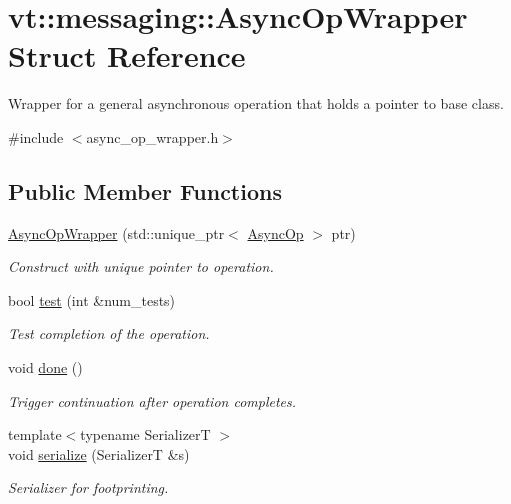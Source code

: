 \hypertarget{structvt_1_1messaging_1_1_async_op_wrapper}{}\section{vt\+:\+:messaging\+:\+:Async\+Op\+Wrapper Struct Reference}
\label{structvt_1_1messaging_1_1_async_op_wrapper}


Wrapper for a general asynchronous operation that holds a pointer to base class.  




{\ttfamily \#include $<$async\+\_\+op\+\_\+wrapper.\+h$>$}

\subsection*{Public Member Functions}
\begin{DoxyCompactItemize}
\item 
\hyperlink{structvt_1_1messaging_1_1_async_op_wrapper_a06c7dd199e7b2c252e23c8d81950feed}{Async\+Op\+Wrapper} (std\+::unique\+\_\+ptr$<$ \hyperlink{structvt_1_1messaging_1_1_async_op}{Async\+Op} $>$ ptr)
\begin{DoxyCompactList}\small\item\em Construct with unique pointer to operation. \end{DoxyCompactList}\item 
bool \hyperlink{structvt_1_1messaging_1_1_async_op_wrapper_a09ca2119c78c9b3663ad6a3708d3a3c7}{test} (int \&num\+\_\+tests)
\begin{DoxyCompactList}\small\item\em Test completion of the operation. \end{DoxyCompactList}\item 
void \hyperlink{structvt_1_1messaging_1_1_async_op_wrapper_afe1b0def9a79849baa18373787440714}{done} ()
\begin{DoxyCompactList}\small\item\em Trigger continuation after operation completes. \end{DoxyCompactList}\item 
{\footnotesize template$<$typename SerializerT $>$ }\\void \hyperlink{structvt_1_1messaging_1_1_async_op_wrapper_a219a6d0d317bd75c0d559dbb91838166}{serialize} (SerializerT \&s)
\begin{DoxyCompactList}\small\item\em Serializer for footprinting. \end{DoxyCompactList}\end{DoxyCompactItemize}
